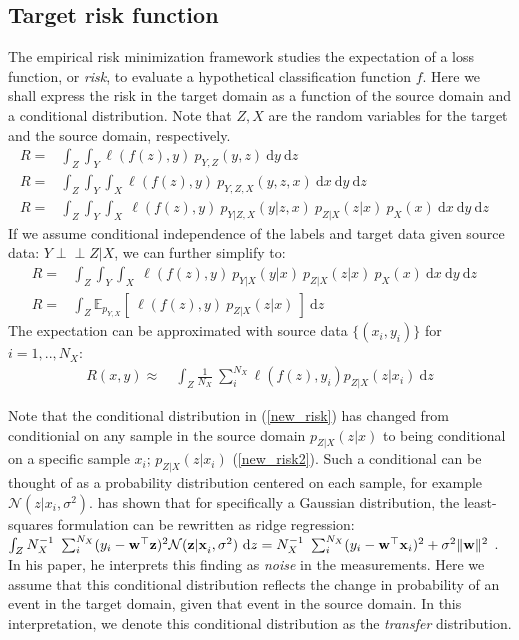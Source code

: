 \documentclass[twoside,11pt]{article}
\def\ci{\perp\!\!\!\perp}
\begin{document}
\subsection{Target risk function}
The empirical risk minimization framework studies the expectation of a loss function, or \emph{risk}, to evaluate a hypothetical classification function $f$. Here we shall express the risk in the target domain as a function of the source domain and a conditional distribution. Note that $Z,X$ are the random variables for the target and the source domain, respectively.
\begin{align}
R =& \int_{Z}\int_{Y}\ell(f(z),y) \ p_{Y,Z}(y,z) \ \mathrm{d}y \ \mathrm{d}z  & \nonumber \\
R=& \int_{Z}\int_{Y}\int_{X} \ell(f(z),y) \ p_{Y,Z,X}(y,z,x) \ \mathrm{d}x \ \mathrm{d}y \ \mathrm{d}z & \nonumber \\
R =& \int_{Z}\int_{Y}\int_{X} \ \ell(f(z),y) \ p_{Y|Z,X}(y|z,x) \ p_{Z|X}(z|x)  \ p_{X}(x) \ \mathrm{d}x \ \mathrm{d}y \ \mathrm{d}z & \nonumber 
\end{align}
If we assume conditional independence of the labels and target data given source data: $Y \ci Z | X$, we can further simplify to:
\begin{align}
R =& \int_{Z}\int_{Y}\int_{X} \ \ell(f(z),y) \ p_{Y|X}(y|x) \ p_{Z|X}(z|x)  \ p_{X}(x) \ \mathrm{d}x \ \mathrm{d}y \ \mathrm{d}z &  \nonumber \\
R =& \int_{Z} \mathbb{E}_{p_{Y,X}}\left[ \ \ell(f(z),y) \ p_{Z|X}(z|x) \ \right] \ \mathrm{d}z & \label{new_risk} 
\end{align}
The expectation can be approximated with source data $\{(x_{i},y_{i})\}$ for $i=1,.. , N_{X}$:
\begin{align}
R(x,y) \approx &\  \int_{Z} \frac{1}{N_{X}} \ \sum_{i}^{N_{X}} \ell(f(z),y_{i}) p_{Z|X} (z|x_{i}) \ \mathrm{d}z \label{new_risk2}
\end{align}

Note that the conditional distribution in (\ref{new_risk}) has changed from conditionial on any sample in the source domain $p_{Z|X}(z|x)$ to being conditional on a specific sample $x_{i}$; $p_{Z|X}(z|x_{i})$ (\ref{new_risk2}). Such a conditional can be thought of as a probability distribution centered on each sample, for example $\mathcal{N}(z| x_{i}, \sigma^{2})$. \cite{bishop1995training} has shown that for specifically a Gaussian distribution, the least-squares formulation can be rewritten as ridge regression: $\int_{Z} N_{X}^{-1} \ \sum_{i}^{N_{X}} (y_{i}-{\bf w^{\top}z})^{2} \mathcal{N}({\bf z|x}_{i}, \sigma^{2}) \ \mathrm{d}z = N_{X}^{-1} \ \sum_{i}^{N_{X}} (y_{i}-{\bf w^{\top}x}_{i})^{2} + \sigma^{2}\|{\bf w} \|^{2}$ \label{new_risk2}. In his paper, he interprets this finding as \emph{noise} in the measurements. Here we assume that this conditional distribution reflects the change in probability of an event in the target domain, given that event in the source domain. In this interpretation, we denote this conditional distribution as the \emph{transfer} distribution. 
\end{document}
